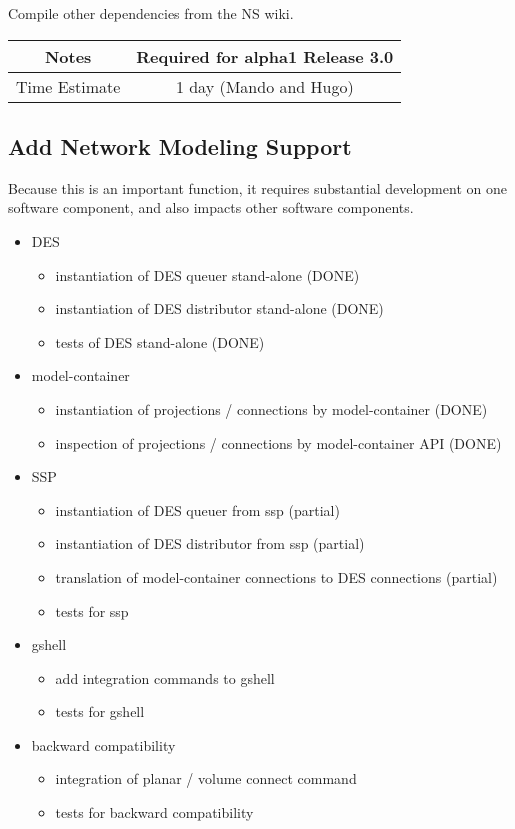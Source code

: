 \documentclass[12pt]{article}
\begin{document}
Compile other dependencies from the NS wiki.

{
  \vspace{5mm}
  \centering
  \begin{tabular}{|c|c|}
    \hline
    Notes
    & Required for alpha1 Release 3.0 \\
    \hline
    Time Estimate
    & 1 day (Mando and Hugo) \\
    \hline
  \end{tabular}
}


\subsection{Add Network Modeling Support}

Because this is an important function, it requires substantial
development on one software component, and also impacts other software
components.

\begin{itemize}
\item DES
  \begin{itemize}
  \item instantiation of DES queuer stand-alone (DONE)
  \item instantiation of DES distributor stand-alone (DONE)
  \item tests of DES stand-alone (DONE)
  \end{itemize}
\item model-container
  \begin{itemize}
  \item instantiation of projections / connections by model-container (DONE)
  \item inspection of projections / connections by model-container API (DONE)
  \end{itemize}
\item SSP
  \begin{itemize}
  \item instantiation of DES queuer from ssp (partial)
  \item instantiation of DES distributor from ssp (partial)
  \item translation of model-container connections to DES connections (partial)
  \item tests for ssp
  \end{itemize}
\item gshell
  \begin{itemize}
  \item add integration commands to gshell
  \item tests for gshell
  \end{itemize}
\item backward compatibility
  \begin{itemize}
  \item integration of planar / volume connect command
  \item tests for backward compatibility
  \end{itemize}
\end{itemize}
\end{document}
